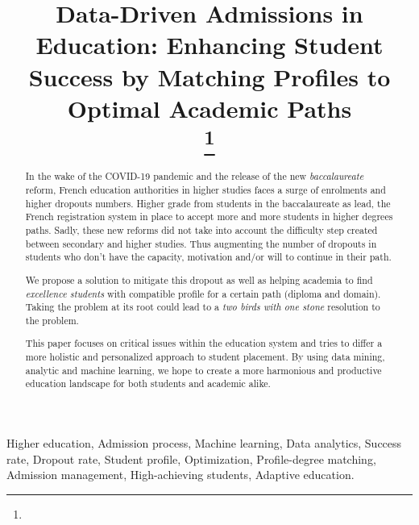 \documentclass[conference]{IEEEtran}
\begin{document}
\title{Data-Driven Admissions in Education: Enhancing Student Success by Matching Profiles to Optimal Academic Paths\\
{\footnotesize \textsuperscript{}}
\thanks{}
}

\author{
}
\maketitle

\begin{abstract}
In the wake of the COVID-19 pandemic and the release of the new \textit{baccalaureate} reform, French education authorities in higher studies faces a surge of enrolments and higher dropouts numbers. Higher grade from students in the baccalaureate as lead, the French registration system in place to accept more and more students in higher degrees paths. Sadly, these new reforms did not take into account the difficulty step created between secondary and higher studies. Thus augmenting the number of dropouts in students who don't have the capacity, motivation and/or will to continue in their path. 

We propose a solution to mitigate this dropout as well as helping academia to find \textit{excellence students} with compatible profile for a certain path (diploma and domain). Taking the problem at its root could lead to a \textit{two birds with one stone} resolution to the problem.

This paper focuses on critical issues within the education system and tries to differ a more holistic and personalized approach to student placement. By using data mining, analytic and machine learning, we hope to create a more harmonious and productive education landscape for both students and academic alike.
\end{abstract}
\vspace{8pt}
\begin{IEEEkeywords}
Higher education, Admission process, Machine learning, Data analytics, Success rate, Dropout rate, Student profile, Optimization, Profile-degree matching, Admission management, High-achieving students, Adaptive education.
\end{IEEEkeywords}
\vspace{16pt}
\end{document}
